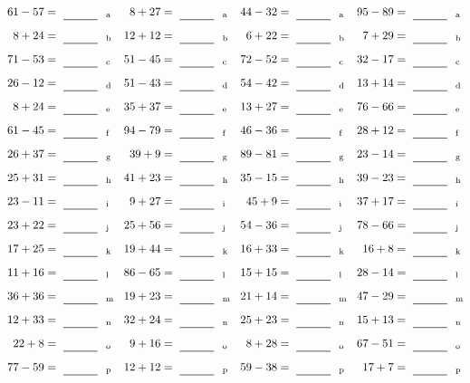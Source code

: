 \documentclass
[
  draft    = true,
  fontsize = 11pt,
  parskip  = half-
]
{scrartcl}
\begin{document}
\clearpage
\begin{align*}
    \pline{61-57}&=\rline{a}
  & \pline{8+27}&=\rline{a}
  & \pline{44-32}&=\rline{a}
  & \pline{95-89}&=\rline{a} \\[1ex]
    \pline{8+24}&=\rline{b}
  & \pline{12+12}&=\rline{b}
  & \pline{6+22}&=\rline{b}
  & \pline{7+29}&=\rline{b} \\[1ex]
    \pline{71-53}&=\rline{c}
  & \pline{51-45}&=\rline{c}
  & \pline{72-52}&=\rline{c}
  & \pline{32-17}&=\rline{c} \\[1ex]
    \pline{26-12}&=\rline{d}
  & \pline{51-43}&=\rline{d}
  & \pline{54-42}&=\rline{d}
  & \pline{13+14}&=\rline{d} \\[1ex]
    \pline{8+24}&=\rline{e}
  & \pline{35+37}&=\rline{e}
  & \pline{13+27}&=\rline{e}
  & \pline{76-66}&=\rline{e} \\[1ex]
    \pline{61-45}&=\rline{f}
  & \pline{94-79}&=\rline{f}
  & \pline{46-36}&=\rline{f}
  & \pline{28+12}&=\rline{f} \\[1ex]
    \pline{26+37}&=\rline{g}
  & \pline{39+9}&=\rline{g}
  & \pline{89-81}&=\rline{g}
  & \pline{23-14}&=\rline{g} \\[1ex]
    \pline{25+31}&=\rline{h}
  & \pline{41+23}&=\rline{h}
  & \pline{35-15}&=\rline{h}
  & \pline{39-23}&=\rline{h} \\[1ex]
    \pline{23-11}&=\rline{i}
  & \pline{9+27}&=\rline{i}
  & \pline{45+9}&=\rline{i}
  & \pline{37+17}&=\rline{i} \\[1ex]
    \pline{23+22}&=\rline{j}
  & \pline{25+56}&=\rline{j}
  & \pline{54-36}&=\rline{j}
  & \pline{78-66}&=\rline{j} \\[1ex]
    \pline{17+25}&=\rline{k}
  & \pline{19+44}&=\rline{k}
  & \pline{16+33}&=\rline{k}
  & \pline{16+8}&=\rline{k} \\[1ex]
    \pline{11+16}&=\rline{l}
  & \pline{86-65}&=\rline{l}
  & \pline{15+15}&=\rline{l}
  & \pline{28-14}&=\rline{l} \\[1ex]
    \pline{36+36}&=\rline{m}
  & \pline{19+23}&=\rline{m}
  & \pline{21+14}&=\rline{m}
  & \pline{47-29}&=\rline{m} \\[1ex]
    \pline{12+33}&=\rline{n}
  & \pline{32+24}&=\rline{n}
  & \pline{25+23}&=\rline{n}
  & \pline{15+13}&=\rline{n} \\[1ex]
    \pline{22+8}&=\rline{o}
  & \pline{9+16}&=\rline{o}
  & \pline{8+28}&=\rline{o}
  & \pline{67-51}&=\rline{o} \\[1ex]
    \pline{77-59}&=\rline{p}
  & \pline{12+12}&=\rline{p}
  & \pline{59-38}&=\rline{p}
  & \pline{17+7}&=\rline{p}
\end{align*}
\end{document}
